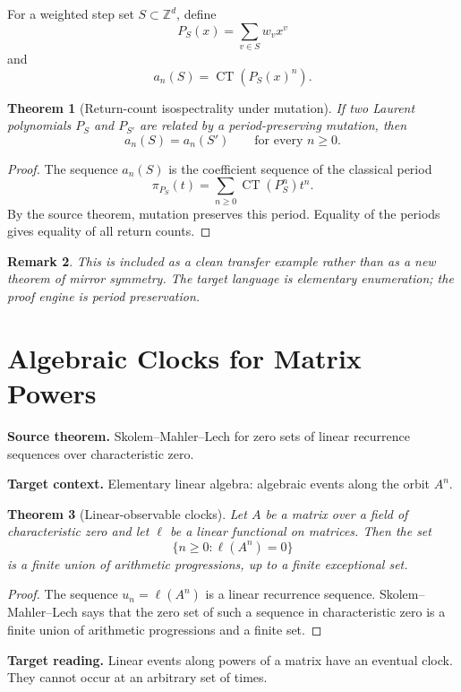 \documentclass[11pt]{article}
\newtheorem{theorem}{Theorem}[section]
\newtheorem{remark}[theorem]{Remark}
\DeclareMathOperator{\CT}{CT}
\begin{document}
For a weighted step set \(S\subset\mathbb Z^d\), define
\[
P_S(x)=\sum_{v\in S}w_vx^v
\]
and
\[
a_n(S)=\CT(P_S(x)^n).
\]

\begin{theorem}[Return-count isospectrality under mutation]
If two Laurent polynomials \(P_S\) and \(P_{S'}\) are related by a period-preserving mutation, then
\[
a_n(S)=a_n(S')
\qquad
\text{for every }n\geq0.
\]
\end{theorem}

\begin{proof}
The sequence \(a_n(S)\) is the coefficient sequence of the classical period
\[
\pi_{P_S}(t)=\sum_{n\geq0}\CT(P_S^n)t^n.
\]
By the source theorem, mutation preserves this period. Equality of the periods gives equality of all return counts.
\end{proof}

\begin{remark}
This is included as a clean transfer example rather than as a new theorem of mirror symmetry. The target language is elementary enumeration; the proof engine is period preservation.
\end{remark}

\section{Algebraic Clocks for Matrix Powers}

\textbf{Source theorem.}
Skolem--Mahler--Lech for zero sets of linear recurrence sequences over characteristic zero.

\textbf{Target context.}
Elementary linear algebra: algebraic events along the orbit \(A^n\).

\begin{theorem}[Linear-observable clocks]
Let \(A\) be a matrix over a field of characteristic zero and let \(\ell\) be a linear functional on matrices. Then the set
\[
\{n\geq0:\ell(A^n)=0\}
\]
is a finite union of arithmetic progressions, up to a finite exceptional set.
\end{theorem}

\begin{proof}
The sequence \(u_n=\ell(A^n)\) is a linear recurrence sequence. Skolem--Mahler--Lech says that the zero set of such a sequence in characteristic zero is a finite union of arithmetic progressions and a finite set.
\end{proof}

\textbf{Target reading.}
Linear events along powers of a matrix have an eventual clock. They cannot occur at an arbitrary set of times.
\end{document}

